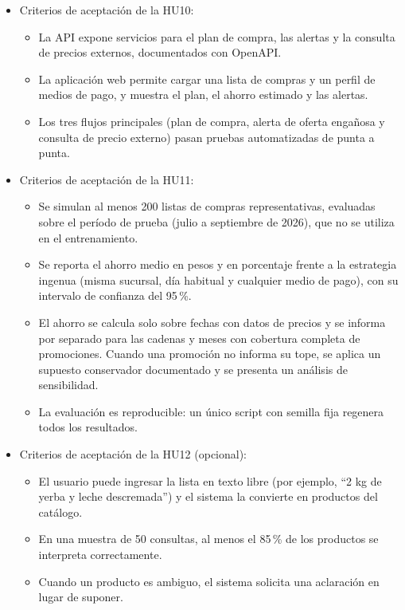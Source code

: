 \documentclass[
11pt, %
]{charter}
\begin{document}
\begin{itemize}
\begin{itemize}
\begin{itemize}
			\item Si el producto no se encuentra en la base, el sistema lo informa en lugar de emitir un veredicto.
		\end{itemize}
		\item Criterios de aceptación de la HU10:
		\begin{itemize}
			\item La API expone servicios para el plan de compra, las alertas y la consulta de precios externos, documentados con OpenAPI.
			\item La aplicación web permite cargar una lista de compras y un perfil de medios de pago, y muestra el plan, el ahorro estimado y las alertas.
			\item Los tres flujos principales (plan de compra, alerta de oferta engañosa y consulta de precio externo) pasan pruebas automatizadas de punta a punta.
		\end{itemize}
		\item Criterios de aceptación de la HU11:
		\begin{itemize}
			\item Se simulan al menos 200 listas de compras representativas, evaluadas sobre el período de prueba (julio a septiembre de 2026), que no se utiliza en el entrenamiento.
			\item Se reporta el ahorro medio en pesos y en porcentaje frente a la estrategia ingenua (misma sucursal, día habitual y cualquier medio de pago), con su intervalo de confianza del 95\,\%.
			\item El ahorro se calcula solo sobre fechas con datos de precios y se informa por separado para las cadenas y meses con cobertura completa de promociones. Cuando una promoción no informa su tope, se aplica un supuesto conservador documentado y se presenta un análisis de sensibilidad.
			\item La evaluación es reproducible: un único script con semilla fija regenera todos los resultados.
		\end{itemize}
		\item Criterios de aceptación de la HU12 (opcional):
		\begin{itemize}
			\item El usuario puede ingresar la lista en texto libre (por ejemplo, ``2 kg de yerba y leche descremada'') y el sistema la convierte en productos del catálogo.
			\item En una muestra de 50 consultas, al menos el 85\,\% de los productos se interpreta correctamente.
			\item Cuando un producto es ambiguo, el sistema solicita una aclaración en lugar de suponer.
		\end{itemize}
	\end{itemize}
\end{itemize}
\end{document}
